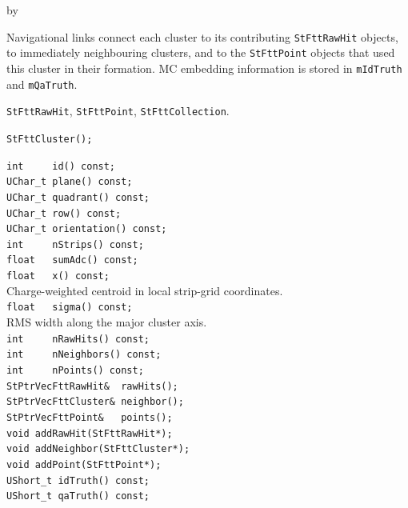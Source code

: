 \documentclass[twoside]{article}
\newcommand{\entrylabel}[1]{\mbox{\textbf{{#1}}}\hfil}%
\newenvironment{entry}
{\begin{list}{}%
    {\renewcommand{\makelabel}{\entrylabel}%
     \setlength{\labelwidth}{90pt}%
     \setlength{\leftmargin}{\labelwidth}
     \advance\leftmargin by \labelsep%
      }%
    }%
  {\end{list}}
\newcommand{\Entrylabel}[1]%
{\raisebox{0pt}[1ex][0pt]{\makebox[\labelwidth][l]%
    {\parbox[t]{\labelwidth}{\hspace{0pt}\textbf{{#1}}}}}}
\newenvironment{Entry}%
{\renewcommand{\entrylabel}{\Entrylabel}\begin{entry}}%
  {\end{entry}}
\begin{document}
\begin{Entry}
  Navigational links connect each cluster to its contributing \texttt{StFttRawHit}
  objects, to immediately neighbouring clusters, and to the \texttt{StFttPoint} objects
  that used this cluster in their formation.  MC embedding information is stored in
  \texttt{mIdTruth} and \texttt{mQaTruth}.
\item[Related Classes]
  \texttt{StFttRawHit}, \texttt{StFttPoint}, \texttt{StFttCollection}.
\item[Public\\ Constructors]
    \verb+StFttCluster();+\\
\item[Public Member\\ Functions]
    \verb+int     id() const;+\\
    \verb+UChar_t plane() const;+\\
    \verb+UChar_t quadrant() const;+\\
    \verb+UChar_t row() const;+\\
    \verb+UChar_t orientation() const;+\\
    \verb+int     nStrips() const;+\\
    \verb+float   sumAdc() const;+\\
    \verb+float   x() const;+\\
    Charge-weighted centroid in local strip-grid coordinates.\\[2pt]
    \verb+float   sigma() const;+\\
    RMS width along the major cluster axis.\\[2pt]
    \verb+int     nRawHits() const;+\\
    \verb+int     nNeighbors() const;+\\
    \verb+int     nPoints() const;+\\
    \verb+StPtrVecFttRawHit&  rawHits();+\\
    \verb+StPtrVecFttCluster& neighbor();+\\
    \verb+StPtrVecFttPoint&   points();+\\
    \verb+void addRawHit(StFttRawHit*);+\\
    \verb+void addNeighbor(StFttCluster*);+\\
    \verb+void addPoint(StFttPoint*);+\\
    \verb+UShort_t idTruth() const;+\\
    \verb+UShort_t qaTruth() const;+\\
\end{Entry}
\clearpage
\end{document}
